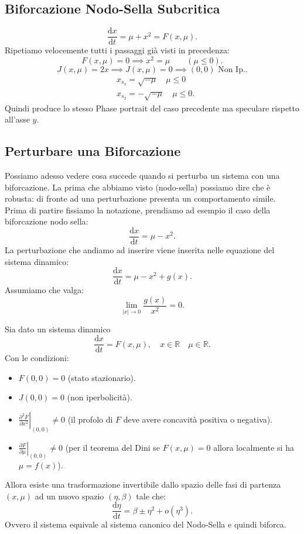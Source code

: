 \subsection{Biforcazione Nodo-Sella Subcritica}%
\label{sub:Biforcazione Nodo-Sella Subcritica}
\[
    \frac{\text{d} x}{\text{d} t} = \mu  + x^2 = F(x, \mu) 
.\] 
Ripetiamo velocemente tutti i passaggi già visti in precedenza:
\[
    F(x, \mu) = 0 \implies  x^2 = \mu  \qquad  (\mu\le  0) 
.\] 
\[
    J(x, \mu) = 2x \implies  J(x, \mu) =0 \implies  (0, 0) \text{ Non Ip.}
.\] 
\[\begin{aligned}
    &x_{s_1}= \sqrt{-\mu} \quad  \mu\le 0\\
    &x_{s_2}=-\sqrt{-\mu} \quad  \mu\le 0
.\end{aligned}\]
Quindi produce lo stesso Phase portrait del caso precedente ma speculare rispetto all'asse $y$.
\subsection{Perturbare una Biforcazione}%
Possiamo adesso vedere cosa succede quando si perturba un sistema con una biforcazione. La prima che abbiamo visto (nodo-sella) possiamo dire che è robusta: di fronte ad una perturbazione presenta un comportamento simile.\\
Prima di partire fissiamo la notazione, prendiamo ad esempio il caso della biforcazione nodo sella: 
\[
    \frac{\text{d} x}{\text{d} t} = \mu-x^2
.\] 
La perturbazione che andiamo ad inserire viene inserita nelle equazione del sistema dinamico:
\[
    \frac{\text{d} x}{\text{d} t} = \mu-x^2+g(x) 
.\] 
Assumiamo che valga:
\[
    \lim_{\left|x\right| \to 0} \frac{g(x)}{x^2} = 0
.\] 
\begin{thm}
    Sia dato un sistema dinamico
    \[
	\frac{\text{d} x}{\text{d} t} = F(x, \mu), \quad  x\in \mathbb{R} \quad  \mu\in \mathbb{R}
    .\] 
    Con le condizioni:
    \begin{itemize}
	\item $F(0,0)= 0$  (stato stazionario).
	\item $J(0, 0) = 0$  (non iperbolicità).
	\item $\left.\frac{\partial ^2F}{\partial x^2} \right|_{(0,0)}\neq 0$ (il profolo di $F$  deve avere concavità positiva o negativa).
	\item $\left.\frac{\partial F}{\partial \mu}\right|_{(0, 0)}\neq 0$ (per il teorema del Dini se $F(x, \mu) = 0$ 
		allora localmente si ha $\mu =f(x)$).
    \end{itemize}
    Allora esiste una trasformazione invertibile dallo spazio delle fasi di partenza $(x, \mu )$  ad un nuovo spazio $(\eta, \beta)$  tale che:
    \[
	\frac{\text{d} \eta}{\text{d} t} = \beta\pm \eta^2 + o(\eta^3) 
    .\] 
    Ovvero il sistema equivale al sistema canonico del Nodo-Sella e quindi biforca.
\end{thm}
\noindent

